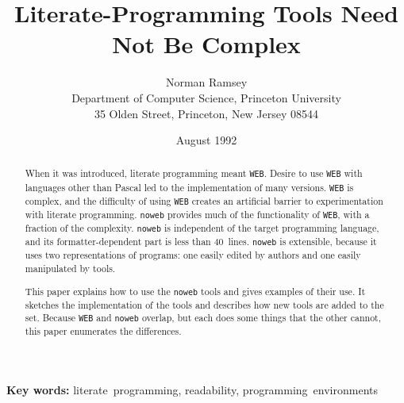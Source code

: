\newif\iftr
\trfalse		%
\iftr
\documentstyle[11pt,noweb,tr]{article}
\else
{}
\fi
\title{Literate-Programming Tools Need Not Be Complex}
\author{Norman Ramsey\\Department of Computer Science, Princeton University\\
35 Olden Street, Princeton, New Jersey 08544}
\iftr\reportno{CS-TR-351-91}
\date{October 1991\\Revised August 1992}
\else
\date{August 1992}
\fi
\setcounter{secnumdepth}{0}
\makeatletter
\def\refno#1{\nocite{#1}\@ifundefined
       {b@#1}{{\bf ?}\@warning
       {Reference number `#1' on page \thepage \space undefined}}%
{\hbox{\csname b@#1\endcsname}}}
\makeatother

\def\remark#1{\marginpar{\raggedright\hbadness=10000\footnotesize\it #1}}



\maketitle

\begin{abstract}
When it was introduced, literate programming meant {\tt WEB}.
Desire to use {\tt WEB} with languages other than Pascal led to the
implementation of many versions.
{\tt WEB} is complex, and the difficulty of using {\tt WEB} creates
an artificial barrier to
experimentation with literate programming.
 {\tt noweb} provides much of the functionality of
{\tt WEB}, with a fraction of the complexity.
{\tt noweb} is independent of the target programming language, and its
formatter-dependent part is less than 40~lines.
{\tt noweb} is extensible, because it uses two
representations of programs: one easily edited by authors and one
easily manipulated by tools.

This paper explains how to use the {\tt noweb} tools and gives
examples of their use.
It sketches the implementation of the tools and describes how new
tools are added to the set.
Because 
{\tt WEB} and {\tt noweb} overlap, but each does some things that the
other cannot,
this paper enumerates the differences.
\end{abstract}

\iftr\else
\begin{center}\small
{\bf Key words:}
literate~programming, readability, programming~environments
\end{center}
\fi

